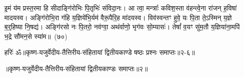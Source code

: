 इ॒मं य॑म प्रस्त॒रमा हि सीदाङ्गि॑रोभिः पि॒तृभिः॑ संविदा॒नः। आ त्वा॒ मन्त्राः᳚ कविश॒स्ता व॑हन्त्वे॒ना रा॑जन् ह॒विषा॑ मादयस्व। अङ्गि॑रोभि॒रा ग॑हि य॒ज्ञिये॑भि॒र्यम॑ वैरू॒पैरि॒ह मा॑दयस्व। विव॑स्वन्तꣳ हुवे॒ यः पि॒ता ते॒\-ऽस्मिन् य॒ज्ञे ब॒र्॒\mbox{}हिष्या नि॒षद्य॑। अङ्गि॑रसो नः पि॒तरो॒ नव॑ग्वा॒ अथ॑र्वाणो॒ भृग॑वः सो॒म्यासः॑। तेषां᳚ व॒यꣳ सु॑म॒तौ य॒ज्ञिया॑ना॒मपि॑ भ॒द्रे सौ॑मन॒से स्या॑म॥~(७०)\ip

{\anuvakamend[{भ॒वा॒स्मभ्य॒मसुं॒ यद॑ग्ने मदन्ति सौमन॒स एक॑ञ्च}]}%

{हरिः॑ ॐ}{॥कृष्ण-यजुर्वेदीय-तैत्तिरीय-संहितायां द्वितीयकाण्डे षष्ठः प्रश्नः समाप्तः॥२-६॥}

\centerline{॥कृष्ण-यजुर्वेदीय-तैत्तिरीय-संहितायां द्वितीयकाण्डः समाप्तः॥२॥}

\medskip

\centerline{\hyperref[sec:startkanda2]{\closesection}}



\kandaend


